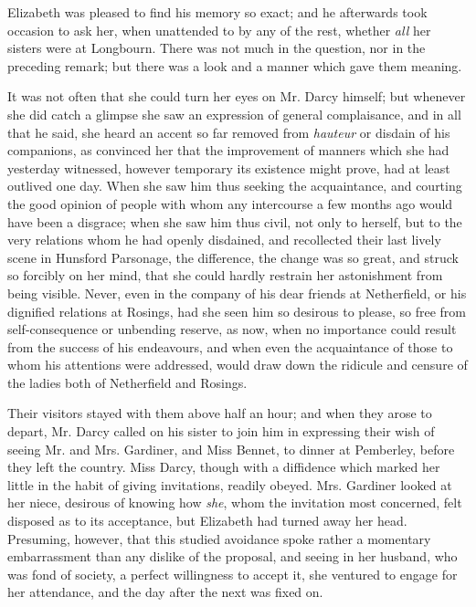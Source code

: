 Elizabeth was pleased to find his memory so exact; and he afterwards took occasion to ask her, when unattended to by any of the rest, whether \textit{all} her sisters were at Longbourn. There was not much in the question, nor in the preceding remark; but there was a look and a manner which gave them meaning.

It was not often that she could turn her eyes on Mr. Darcy himself; but whenever she did catch a glimpse she saw an expression of general complaisance, and in all that he said, she heard an accent so far removed from \textit{hauteur} or disdain of his companions, as convinced her that the improvement of manners which she had yesterday witnessed, however temporary its existence might prove, had at least outlived one day. When she saw him thus seeking the acquaintance, and courting the good opinion of people with whom any intercourse a few months ago would have been a disgrace; when she saw him thus civil, not only to herself, but to the very relations whom he had openly disdained, and recollected their last lively scene in Hunsford Parsonage, the difference, the change was so great, and struck so forcibly on her mind, that she could hardly restrain her astonishment from being visible. Never, even in the company of his dear friends at Netherfield, or his dignified relations at Rosings, had she seen him so desirous to please, so free from self-consequence or unbending reserve, as now, when no importance could result from the success of his endeavours, and when even the acquaintance of those to whom his attentions were addressed, would draw down the ridicule and censure of the ladies both of Netherfield and Rosings.

Their visitors stayed with them above half an hour; and when they arose to depart, Mr. Darcy called on his sister to join him in expressing their wish of seeing Mr. and Mrs. Gardiner, and Miss Bennet, to dinner at Pemberley, before they left the country. Miss Darcy, though with a diffidence which marked her little in the habit of giving invitations, readily obeyed. Mrs. Gardiner looked at her niece, desirous of knowing how \textit{she}, whom the invitation most concerned, felt disposed as to its acceptance, but Elizabeth had turned away her head. Presuming, however, that this studied avoidance spoke rather a momentary embarrassment than any dislike of the proposal, and seeing in her husband, who was fond of society, a perfect willingness to accept it, she ventured to engage for her attendance, and the day after the next was fixed on.

